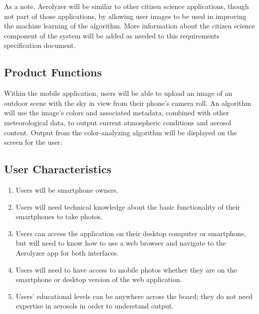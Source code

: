 \documentclass[letterpaper,10pt,draftclsnofoot,onecolumn]{IEEEtran}
\begin{document}
\begin{flushleft}
As a note, Aerolyzer will be similar to other citizen science applications, though not part of those applications, by allowing user images to be used in improving the machine learning of the algorithm. 
More information about the citizen science component of the system will be added as needed to this requirements specification document.

\subsection{Product Functions}
Within the mobile application, users will be able to upload an image of an outdoor scene with the sky in view from their phone’s camera roll.
An algorithm will use the image's colors and associated metadata, combined with other meteorological data, to output current atmospheric conditions and aerosol content. Output from the color-analyzing algorithm will be displayed on the screen for the user.
 
\subsection{User Characteristics}
\begin{enumerate}
	\item Users will be smartphone owners. 
	\item Users will need technical knowledge about the basic functionality of their smartphones to take photos.

	\item Users can access the application on their desktop computer or smartphone, but will need to know how to use a web browser and navigate to the Aerolyzer app for both interfaces. 

	\item Users will need to have access to mobile photos whether they are on the smartphone or desktop version of the web application.

	\item Users’ educational levels can be anywhere across the board; they do not need expertise in aerosols in order to understand output. 
\end{enumerate}


\end{flushleft}
\end{document}
